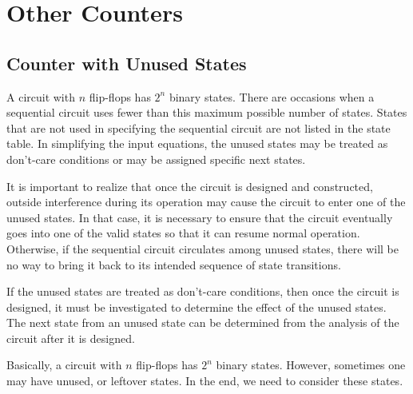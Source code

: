 \columnbreak

\section{Other Counters}
\label{sec:other-counter}

\subsection{Counter with Unused States}
\label{subsec:counter-with-unused-states}

A circuit with $n$ flip-flops has $2^n$ binary states. There are occasions when a sequential circuit uses fewer than this maximum possible number of states. States that are not used in specifying the sequential circuit are not listed in the state table. In simplifying the input equations, the unused states may be treated as don't-care conditions or may be assigned specific next states. 

It is important to realize that once the circuit is designed and constructed, outside interference during its operation may cause the circuit to enter one of the unused states. In that case, it is necessary to ensure that the circuit eventually goes into one of the valid states so that it can resume normal operation. Otherwise, if the sequential circuit circulates among unused states, there will be no way to bring it back to its intended sequence of state transitions. 

If the unused states are treated as don't-care conditions, then once the circuit is designed, it must be investigated to determine the effect of the unused states. The next state from an unused state can be determined from the analysis of the circuit after it is designed.

Basically, a circuit with $n$ flip-flops has $2^n$ binary states. However, sometimes one may have unused, or leftover states. In the end, we need to consider these states.

\newpage

